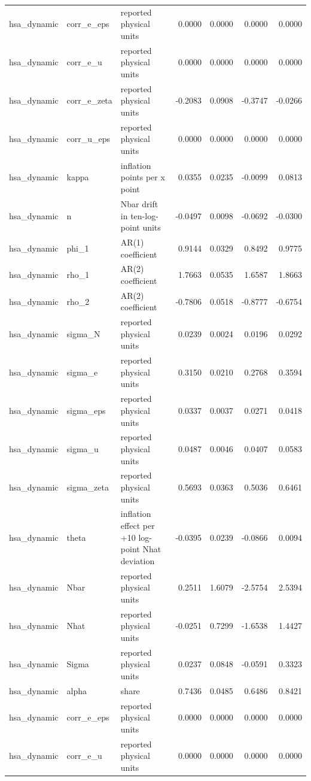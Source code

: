 \begin{tabular}{lllrrrr}
hsa\_dynamic & corr\_e\_eps & reported physical units & 0.0000 & 0.0000 & 0.0000 & 0.0000 \\
hsa\_dynamic & corr\_e\_u & reported physical units & 0.0000 & 0.0000 & 0.0000 & 0.0000 \\
hsa\_dynamic & corr\_e\_zeta & reported physical units & -0.2083 & 0.0908 & -0.3747 & -0.0266 \\
hsa\_dynamic & corr\_u\_eps & reported physical units & 0.0000 & 0.0000 & 0.0000 & 0.0000 \\
hsa\_dynamic & kappa & inflation points per x point & 0.0355 & 0.0235 & -0.0099 & 0.0813 \\
hsa\_dynamic & n & Nbar drift in ten-log-point units & -0.0497 & 0.0098 & -0.0692 & -0.0300 \\
hsa\_dynamic & phi\_1 & AR(1) coefficient & 0.9144 & 0.0329 & 0.8492 & 0.9775 \\
hsa\_dynamic & rho\_1 & AR(2) coefficient & 1.7663 & 0.0535 & 1.6587 & 1.8663 \\
hsa\_dynamic & rho\_2 & AR(2) coefficient & -0.7806 & 0.0518 & -0.8777 & -0.6754 \\
hsa\_dynamic & sigma\_N & reported physical units & 0.0239 & 0.0024 & 0.0196 & 0.0292 \\
hsa\_dynamic & sigma\_e & reported physical units & 0.3150 & 0.0210 & 0.2768 & 0.3594 \\
hsa\_dynamic & sigma\_eps & reported physical units & 0.0337 & 0.0037 & 0.0271 & 0.0418 \\
hsa\_dynamic & sigma\_u & reported physical units & 0.0487 & 0.0046 & 0.0407 & 0.0583 \\
hsa\_dynamic & sigma\_zeta & reported physical units & 0.5693 & 0.0363 & 0.5036 & 0.6461 \\
hsa\_dynamic & theta & inflation effect per +10 log-point Nhat deviation & -0.0395 & 0.0239 & -0.0866 & 0.0094 \\
hsa\_dynamic & Nbar & reported physical units & 0.2511 & 1.6079 & -2.5754 & 2.5394 \\
hsa\_dynamic & Nhat & reported physical units & -0.0251 & 0.7299 & -1.6538 & 1.4427 \\
hsa\_dynamic & Sigma & reported physical units & 0.0237 & 0.0848 & -0.0591 & 0.3323 \\
hsa\_dynamic & alpha & share & 0.7436 & 0.0485 & 0.6486 & 0.8421 \\
hsa\_dynamic & corr\_e\_eps & reported physical units & 0.0000 & 0.0000 & 0.0000 & 0.0000 \\
hsa\_dynamic & corr\_e\_u & reported physical units & 0.0000 & 0.0000 & 0.0000 & 0.0000 \\

\end{tabular}
